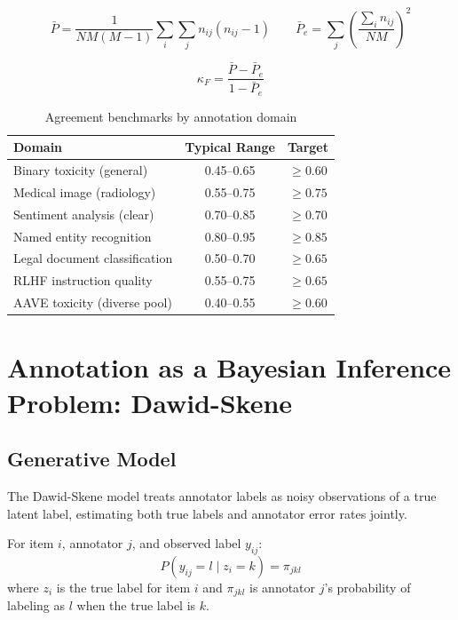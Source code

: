 \[
\bar{P} = \frac{1}{NM(M-1)} \sum_i \sum_j n_{ij}(n_{ij}-1)
\qquad
\bar{P}_e = \sum_j \left(\frac{\sum_i n_{ij}}{NM}\right)^2
\]

\[
\kappa_F = \frac{\bar{P} - \bar{P}_e}{1 - \bar{P}_e}
\]

\begin{table}[htbp]
\caption{Agreement benchmarks by annotation domain}
\label{tab:kappa-benchmarks}
\centering
\begin{tabular}{@{}lcc@{}}
\toprule
\textbf{Domain} & \textbf{Typical Range} & \textbf{Target} \\
\midrule
Binary toxicity (general)      & 0.45--0.65 & $\geq 0.60$ \\
Medical image (radiology)      & 0.55--0.75 & $\geq 0.75$ \\
Sentiment analysis (clear)     & 0.70--0.85 & $\geq 0.70$ \\
Named entity recognition       & 0.80--0.95 & $\geq 0.85$ \\
Legal document classification  & 0.50--0.70 & $\geq 0.65$ \\
RLHF instruction quality       & 0.55--0.75 & $\geq 0.65$ \\
AAVE toxicity (diverse pool)   & 0.40--0.55 & $\geq 0.60$ \\
\bottomrule
\end{tabular}
\end{table}

\section{Annotation as a Bayesian Inference Problem: Dawid-Skene}

\subsection{Generative Model}

The Dawid-Skene model \autocite{dawid1979maximum} treats annotator labels as noisy observations of a true latent label, estimating both true labels and annotator error rates jointly.

For item $i$, annotator $j$, and observed label $y_{ij}$:
\[
P(y_{ij} = l \mid z_i = k) = \pi_{jkl}
\]
where $z_i$ is the true label for item $i$ and $\pi_{jkl}$ is annotator $j$'s probability of labeling as $l$ when the true label is $k$.


